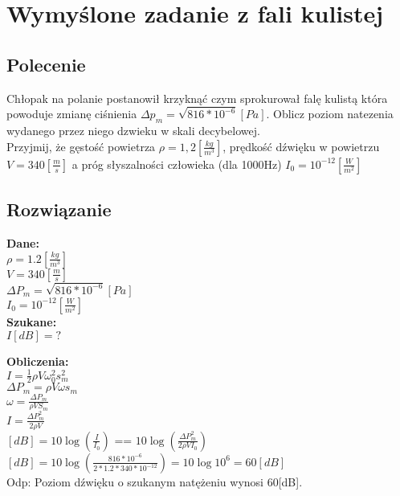 \documentclass[a4paper,14pt]{extarticle}  %
\begin{document}
    \section{Wymyślone zadanie z fali kulistej}
        \subsection{Polecenie}
        Chłopak na polanie postanowił krzyknąć czym sprokurował falę kulistą która powoduje zmianę ciśnienia $\Delta p_m = \sqrt{816*10^{-6}}[Pa]$.
        Oblicz poziom natezenia wydanego przez niego dzwieku w skali decybelowej.\\
        Przyjmij, że gęstość powietrza $\rho = 1,2 [\frac{kg}{m^3}]$, prędkość dźwięku w powietrzu $V = 340 [\frac{m}{s}]$ a próg słyszalności człowieka (dla 1000Hz) $I_0 = 10^{-12}[\frac{W}{m^2}]$\\
        \subsection{Rozwiązanie}
        \textbf{Dane:}\\
        
     $\rho = 1.2[\frac{kg}{m^3}]$\\
     $V = 340[\frac{m}{s}]$\\
     $\Delta P_m = \sqrt{816*10^{-6}}[Pa]$\\
     $I_0 = 10^{-12}[\frac{W}{m^2}]$\\
            
        
    
   \textbf{Szukane:}\\ 
     $I[dB] = ?$
    
    
    \textbf{Obliczenia:}\\
    $I = \frac{1}{2}\rho V\omega_0^2 s_m^2 $\\
    $\Delta P_m = \rho V \omega s_m$\\
    $\omega = \frac{\Delta P_m}{\rho VS_m}$\\
    $I = \frac{\Delta P_m^2}{2\rho V}$\\
    $[dB] = 10\log(\frac{I}{I_0})$  ==  $10\log(\frac{\Delta P_m^2}{2\rho VI_0})$\\
    $[dB] = 10\log(\frac{816*10^{-6}}{2*1.2*340*10^{-12}}) = 10\log10^6 = 60[dB]$\\
    Odp: Poziom dźwięku o szukanym natężeniu wynosi 60[dB].
    
\end{document}
